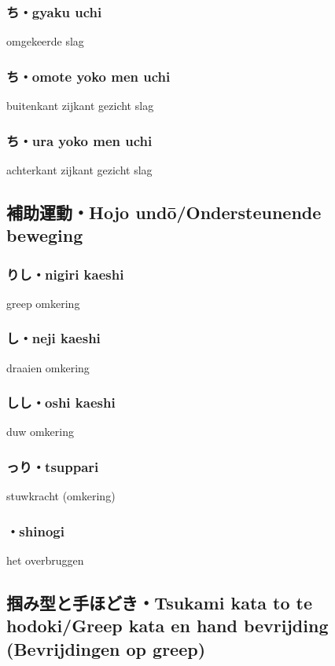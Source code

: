 \subsubsection{ち・gyaku uchi}
omgekeerde slag

\subsubsection{ち・omote yoko men uchi}
buitenkant zijkant gezicht slag

\subsubsection{ち・ura yoko men uchi}
achterkant zijkant gezicht slag

\subsection{補助運動・Hojo und\={o}/Ondersteunende beweging}
\subsubsection{りし・nigiri kaeshi}
greep omkering

\subsubsection{し・neji kaeshi}
draaien omkering

\subsubsection{しし・oshi kaeshi}
duw omkering

\subsubsection{っり・tsuppari}
stuwkracht (omkering)

\subsubsection{・shinogi}
het overbruggen

\subsection{掴み型と手ほどき・Tsukami kata to te hodoki/Greep kata en hand bevrijding (Bevrijdingen op greep)}
